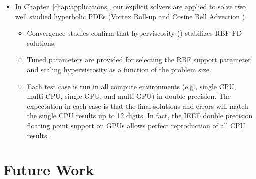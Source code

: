 \begin{itemize}
\item In Chapter~\ref{chap:applications}, our explicit solvers are applied to solve two well studied hyperbolic PDEs (Vortex Roll-up \cite{NairTransport05, NairJablonowski08} and Cosine Bell Advection \cite{JakobChien1995}).
\begin{itemize} 
\item Convergence studies confirm that hyperviscosity (\cite{Fornberg2011b}) stabilizes RBF-FD solutions.
\item Tuned parameters are provided for selecting the RBF support parameter and scaling hyperviscosity as a function of the problem size.
\item Each test case is run in all compute environments (e.g., single CPU, multi-CPU, single GPU, and multi-GPU) in double precision. The expectation in each case is that the final solutions and errors will match the single CPU results up to 12 digits. In fact, the IEEE double precision floating point support on GPUs allows perfect reproduction of all CPU results. 
\end{itemize}

\end{itemize} 



\section{Future Work}


